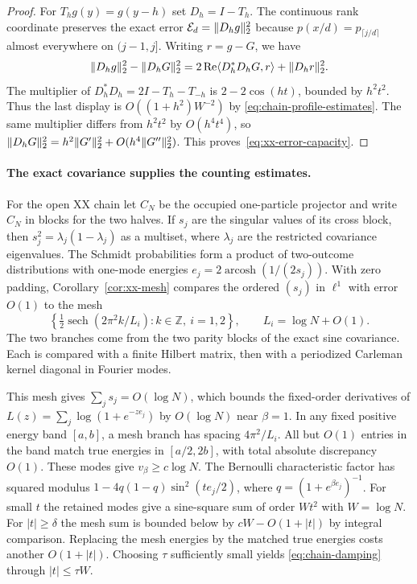 \begin{proof}
For $T_h g(y)=g(y-h)$ set $D_h=I-T_h$. The continuous rank coordinate
preserves the exact error $\mathcal E_d=\lVert D_hg\rVert_2^2$ because
$p(x/d)=p_{\lceil j/d\rceil}$ almost everywhere on $(j-1,j]$.
Writing $r=g-G$, we have
\[
 \lVert D_hg\rVert_2^2-\lVert D_hG\rVert_2^2
   =2\operatorname{Re}\langle D_h^*D_hG,r\rangle+\lVert D_hr\rVert_2^2.
\]
The multiplier of $D_h^*D_h=2I-T_h-T_{-h}$ is $2-2\cos(ht)$, bounded
by $h^2t^2$. Thus the last display is $O((1+h^2)W^{-2})$ by
\eqref{eq:chain-profile-estimates}. The same multiplier differs from
$h^2t^2$ by $O(h^4t^4)$, so
$\lVert D_hG\rVert_2^2=h^2\lVert G'\rVert_2^2+O(h^4\lVert G''\rVert_2^2)$.
This proves~\eqref{eq:xx-error-capacity}.
\end{proof}

\paragraph{The exact covariance supplies the counting estimates.}
For the open XX chain let $C_N$ be the occupied one-particle projector
and write $C_N$ in blocks for the two halves. If $s_j$ are the singular
values of its cross block, then $s_j^2=\lambda_j(1-\lambda_j)$ as a
multiset, where $\lambda_j$ are the restricted covariance eigenvalues.
The Schmidt probabilities form a product of two-outcome distributions
with one-mode energies $e_j=2\operatorname{arcosh}(1/(2s_j))$.
With zero padding, Corollary~\ref{cor:xx-mesh} compares the ordered
$(s_j)$ in $\ell^1$ with error $O(1)$ to the mesh
\begin{equation}\label{eq:chain-main-mesh}
 \left\{\tfrac12\operatorname{sech}(2\pi^2 k/L_i)
                    :k\in\mathbb Z,\ i=1,2\right\},
 \qquad L_i=\log N+O(1).
\end{equation}
The two branches come from the two parity blocks of the exact sine
covariance. Each is compared with a finite Hilbert matrix, then with a
periodized Carleman kernel diagonal in Fourier modes.

This mesh gives $\sum_j s_j=O(\log N)$, which bounds the fixed-order
derivatives of $L(z)=\sum_j\log(1+e^{-ze_j})$ by $O(\log N)$ near
$\beta=1$. In any fixed positive energy band $[a,b]$, a mesh branch
has spacing $4\pi^2/L_i$. All but $O(1)$ entries in the band match
true energies in $[a/2,2b]$, with total absolute discrepancy $O(1)$.
These modes give $v_\beta\ge c\log N$. The Bernoulli characteristic
factor has squared modulus $1-4q(1-q)\sin^2(te_j/2)$, where
$q=(1+e^{\beta e_j})^{-1}$. For small $t$ the retained modes give a
sine-square sum of order $Wt^2$ with $W=\log N$. For $|t|\ge\delta$
the mesh sum is bounded below by $cW-O(1+|t|)$ by integral comparison.
Replacing the mesh energies by the matched true energies costs another
$O(1+|t|)$. Choosing $\tau$ sufficiently small yields
\eqref{eq:chain-damping} through $|t|\le\tau W$.

